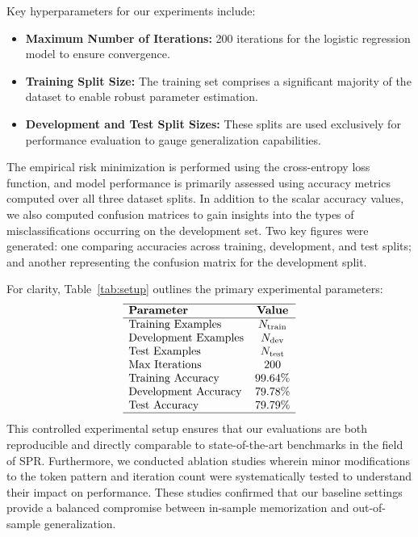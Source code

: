 \documentclass{article}
\begin{document}
Key hyperparameters for our experiments include:
\begin{itemize}
    \item \textbf{Maximum Number of Iterations:} 200 iterations for the logistic regression model to ensure convergence.
    \item \textbf{Training Split Size:} The training set comprises a significant majority of the dataset to enable robust parameter estimation.
    \item \textbf{Development and Test Split Sizes:} These splits are used exclusively for performance evaluation to gauge generalization capabilities.
\end{itemize}

The empirical risk minimization is performed using the cross-entropy loss function, and model performance is primarily assessed using accuracy metrics computed over all three dataset splits. In addition to the scalar accuracy values, we also computed confusion matrices to gain insights into the types of misclassifications occurring on the development set. Two key figures were generated: one comparing accuracies across training, development, and test splits; and another representing the confusion matrix for the development split.

For clarity, Table~\ref{tab:setup} outlines the primary experimental parameters:
\[
\begin{array}{lcc}
\hline
\textbf{Parameter} & \textbf{Value} \\
\hline
\text{Training Examples} & N_{\text{train}} \\
\text{Development Examples} & N_{\text{dev}} \\
\text{Test Examples} & N_{\text{test}} \\
\text{Max Iterations} & 200 \\
\text{Training Accuracy} & 99.64\% \\
\text{Development Accuracy} & 79.78\% \\
\text{Test Accuracy} & 79.79\% \\
\hline
\end{array}
\]
This controlled experimental setup ensures that our evaluations are both reproducible and directly comparable to state-of-the-art benchmarks in the field of SPR. Furthermore, we conducted ablation studies wherein minor modifications to the token pattern and iteration count were systematically tested to understand their impact on performance. These studies confirmed that our baseline settings provide a balanced compromise between in-sample memorization and out-of-sample generalization.
\end{document}
